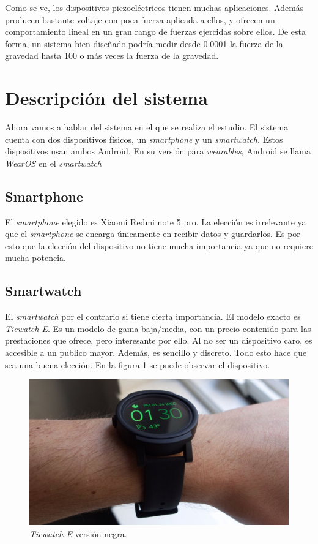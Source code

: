 \documentclass[12pt]{article}
\numberwithin{equation}{section}
\begin{document}
{Como se ve, los dispositivos piezoeléctricos tienen muchas aplicaciones. Además producen bastante voltaje con poca fuerza aplicada a ellos, y ofrecen un comportamiento lineal en un gran rango de fuerzas ejercidas sobre ellos. De esta forma, un sistema bien diseñado podría medir desde 0.0001 la fuerza de la gravedad hasta 100 o más veces la fuerza de la gravedad.
\newpage
\section{Descripción del sistema}
Ahora vamos a hablar del sistema en el que se realiza el estudio. El sistema cuenta con dos dispositivos físicos, un \textit{smartphone} y un \textit{smartwatch}. Estos dispositivos usan ambos Android. En su versión para \textit{wearables}, Android se llama \textit{WearOS} en el \textit{smartwatch}
\subsection{Smartphone}
El \textit{smartphone} elegido es Xiaomi Redmi note 5 pro. La elección es irrelevante ya que el \textit{smartphone} se encarga únicamente en recibir datos y guardarlos. Es por esto que la elección del dispositivo no tiene mucha importancia ya que no requiere mucha potencia.
\subsection{Smartwatch}
El \textit{smartwatch} por el contrario si tiene cierta importancia. El modelo exacto es \textit{Ticwatch E}. Es un modelo de gama baja/media, con un precio contenido para las prestaciones que ofrece, pero interesante por ello. Al no ser un dispositivo caro, es accesible a un publico mayor. Además, es sencillo y discreto. Todo esto hace que sea una buena elección. En la figura \ref{fig:ticwatch} se puede observar el dispositivo.

\begin{figure}[h]
    \centering
    \includegraphics[width=1\textwidth]{ticwatche.jpg}
    \caption{\textit{Ticwatch E} versión negra.}
    \label{fig:ticwatch}
\end{figure}

}
\end{document}
